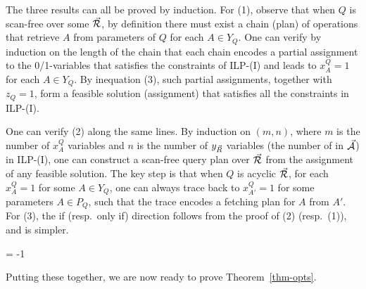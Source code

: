 \begin{proofS}
The three results can all be proved by induction. 
For (1), observe that when $Q$ is scan-free
over some \bds $\vec{{\mathcal R}}$, by definition there must exist a chain
(\ie plan)
of \get operations that %
retrieve 
$A$ from parameters of $Q$
for each $A\in Y_{Q}$. One can verify by induction on the length
of the chain that each chain encodes a partial assignment to the
0/1-variables that satisfies the constraints of ILP-(I) and leads to
$x_{A}^{Q} = 1$ for each $A\in Y_{Q}$. By inequation (3), such
partial assignments, together with $z_{Q} = 1$, form a feasible
solution (\ie assignment) that satisfies all the constraints
in ILP-(I).

One can verify
(2) along the same lines. By induction on $(m, n)$,
where $m$ is the number of $x_{A}^{Q}$ variables and $n$ is the
number of $y_{\vec{R}}$ variables (\ie the number of \bss in
$\vec{{\mathcal A}}$) in ILP-(I), one can construct a scan-free query plan
over $\vec{{\mathcal R}}$ from the assignment of any feasible solution. The
key step is that when $Q$ is acyclic \wrt $\vec{{\mathcal R}}$, for each
$x_{A}^{Q} = 1$ for some $A\in Y_{Q}$, one can always trace back
to $x_{A'}^{Q} = 1$ for some parameters $A\in P_{Q}$, such that
the trace encodes a fetching plan for $A$ from $A'$.
For (3), the if (resp.~only if) direction follows from the proof
of (2) (resp.~(1)), and is simpler. 
\end{proofS}
\looseness = -1


Putting these together, we are now ready to prove
  Theorem~\ref{thm-opts}.

